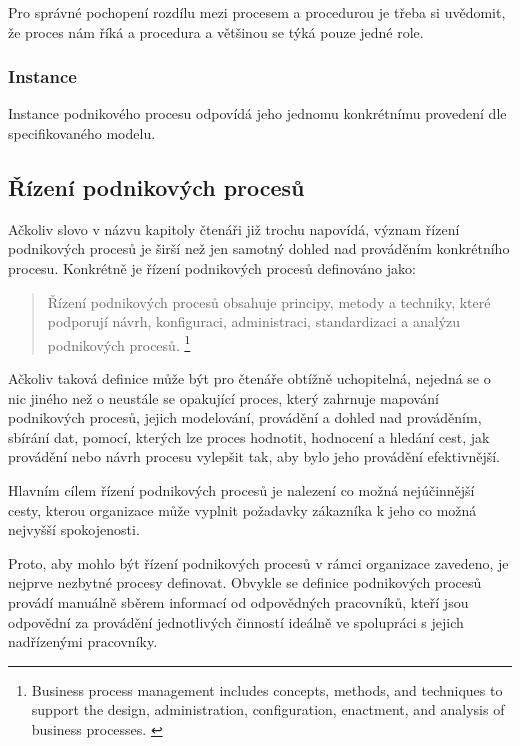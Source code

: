 \documentclass[]{article}
\begin{document}
Pro správné pochopení rozdílu mezi procesem a procedurou je třeba si uvědomit, že proces nám říká  a procedura  a většinou se týká pouze jedné role. \cite{Bandor2007}

\subsubsection{Instance}
Instance podnikového procesu odpovídá jeho jednomu konkrétnímu provedení dle specifikovaného modelu.

\subsection{Řízení podnikových procesů}
Ačkoliv slovo  v názvu kapitoly čtenáři již trochu napovídá, význam řízení podnikových procesů je širší než jen samotný dohled nad prováděním konkrétního procesu. Konkrétně je řízení podnikových procesů definováno jako: \cite{Weske2007}

\begin{quote}
Řízení podnikových procesů obsahuje principy, metody a techniky, které podporují návrh, konfiguraci, administraci, standardizaci a analýzu podnikových procesů.
\footnote{Business process management includes concepts, methods, and techniques to support the design, administration, configuration, enactment, and analysis of business processes. \cite{Weske2007}}
\end{quote}

Ačkoliv taková definice může být pro čtenáře obtížně uchopitelná, nejedná se o nic jiného než o neustále se opakující proces, který zahrnuje mapování podnikových procesů, jejich modelování, provádění a dohled nad prováděním, sbírání dat, pomocí, kterých lze proces hodnotit, hodnocení a hledání cest, jak provádění nebo návrh procesu vylepšit tak, aby bylo jeho provádění efektivnější.

Hlavním cílem řízení podnikových procesů je nalezení co možná nejúčinnější cesty, kterou organizace může vyplnit požadavky zákazníka k jeho co možná nejvyšší spokojenosti. \cite{Jedlitschka2010}

Proto, aby mohlo být řízení podnikových procesů v rámci organizace zavedeno, je nejprve nezbytné procesy definovat. Obvykle se definice podnikových procesů provádí manuálně sběrem informací od odpovědných pracovníků, kteří jsou odpovědní za provádění jednotlivých činností ideálně ve spolupráci s jejich nadřízenými pracovníky.
\end{document}
